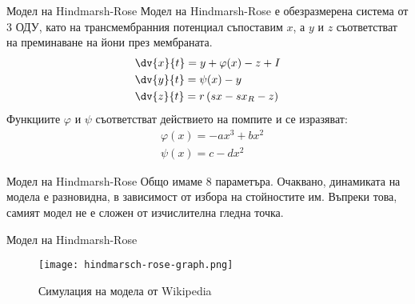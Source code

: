 \begin{frame}[t]{Модел на Hindmarsh-Rose}
    Модел на Hindmarsh-Rose е обезразмерена система от 3 ОДУ, 
    като на трансмембранния потенциал съпоставим $x$,
    а $y$ и $z$ съответстват на преминаване на йони през мембраната.
    \begin{align*}
        &\dv{x}{t}=y + \varphi(x) - z + I\\
        &\dv{y}{t}=\psi(x) - y\\
        &\dv{z}{t}=r\left(sx - sx_R - z\right)
    \end{align*}
    Функциите $\varphi$ и $\psi$ съответстват действието на помпите и се изразяват:
    \begin{align*}
        &\varphi(x) = -ax^3 + bx^2\\
        &\psi(x) = c - dx^2
    \end{align*}
\end{frame}

\begin{frame}[t]{Модел на Hindmarsh-Rose}
    Общо имаме 8 параметъра. Очаквано, динамиката на модела е разновидна, в зависимост от избора на стойностите им.
    Въпреки това, самият модел не е сложен от изчислителна гледна точка.
\end{frame}

\begin{frame}[t]{Модел на Hindmarsh-Rose}
    \begin{figure}[htbp!]
        \centering
        \texttt{[image: hindmarsch-rose-graph.png]}
        \caption{Симулация на модела от Wikipedia}
    \end{figure}
\end{frame}